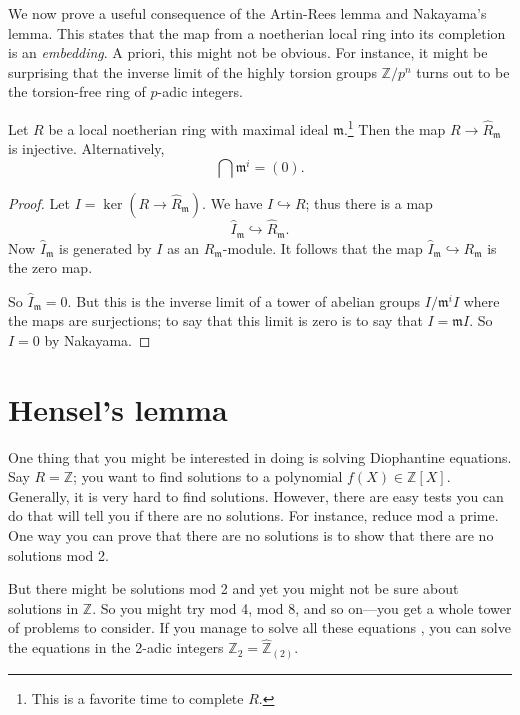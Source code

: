 We now prove a useful consequence of the Artin-Rees lemma and Nakayama's
lemma. This states that the map from a noetherian local ring into its
completion is an \emph{embedding}. A priori, this might not be obvious. For
instance, it might be surprising that the inverse limit of the highly torsion
groups $\mathbb{Z}/p^n$ turns out to be the torsion-free ring of $p$-adic
integers.

\begin{theorem}[Krull] Let $R$ be a local noetherian ring with maximal ideal
$\mathfrak{m}$.\footnote{This is a favorite time to complete $R$.} Then the map
$R \to \hat{R}_{\mathfrak{m}}$ is injective. Alternatively,
\[ \bigcap \mathfrak{m}^i = (0).  \]
\end{theorem} 

\begin{proof} 
Let $I = \ker(R \to \hat{R}_{\mathfrak{m}})$. We have $I \hookrightarrow R$;
thus there is a map
\[ \hat{I}_{\mathfrak{m}}  \hookrightarrow \hat{R}_{\mathfrak{m}}. \]
Now $\hat{I}_{\mathfrak{m}}$ is generated by $I$ as an
$R_{\mathfrak{m}}$-module. It follows that the map $\hat{I}_{\mathfrak{m}}
\hookrightarrow R_{\mathfrak{m}}$ is the zero map. 

So $\hat{I}_{\mathfrak{m}} = 0$. But this is the inverse limit of  a tower of
abelian groups $I/\mathfrak{m}^i I $ where the maps are surjections; to say
that this limit is zero is to say that $I = \mathfrak{m}I$. So $I = 0$ by
Nakayama. 
\end{proof} 

\section{Hensel's lemma} One thing that you might be interested in doing is solving
Diophantine equations. Say $R = \mathbb{Z}$; you want to find solutions to a
polynomial $f(X) \in \mathbb{Z}[X]$. Generally, it is very hard to find
solutions. However, there are easy tests you can do that will tell you if there
are no solutions. For instance, reduce mod a prime. One way you can prove that
there are no solutions is to show that there are no solutions mod 2. 

But there might be solutions mod 2 and yet you might not be sure about
solutions in $\mathbb{Z}$. So you might try mod 4, mod 8, and so on---you get a
whole tower of problems to consider. If you manage to solve all these equations
, you can solve the equations in the 2-adic integers $\mathbb{Z}_2 =
\hat{\mathbb{Z}}_{(2)}$.

